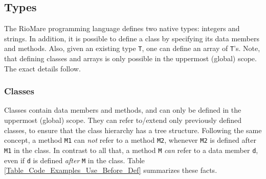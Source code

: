 \documentclass{article}
\begin{document}
\subsection{Types}
The RioMare programming language defines two native types: integers and strings.
In addition, it is possible to define a class by specifying its data members and methods.
Also, given an existing type \verb"T", one can define an array of \verb"T"'s.
Note, that defining classes and arrays is only possible in the uppermost (global) scope.
The exact details follow.
\subsubsection{Classes}
\label{subsubsection_Classes}
Classes contain data members and methods,
and can only be defined in the uppermost (global) scope.
They can refer to/extend only previously defined classes,
to ensure that the class hierarchy has a tree structure.
Following the same concept,
a method \verb"M1" can \textit{not} refer to a method \verb"M2",
whenever \verb"M2" is defined after \verb"M1" in the class.
In contrast to all that,
a method \verb"M" \textit{can} refer to a data member \verb"d",
even if \verb"d" is defined \textit{after} \verb"M" in the class.
Table \ref{Table_Code_Examples_Use_Before_Def} summarizes these facts.
\end{document}
